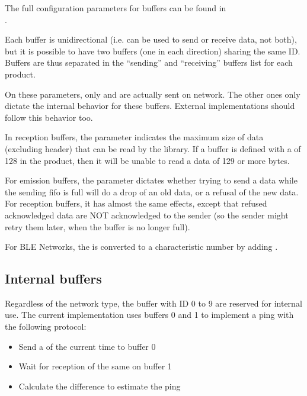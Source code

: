 The full configuration parameters for  buffers can be found in\\
.

Each buffer is unidirectional (i.e. can be used to send or receive data, not both), but it is possible to have two buffers (one in each direction) sharing the same ID. Buffers are thus separated in the ``sending'' and ``receiving'' buffers list for each product.

On these parameters, only  and  are actually sent on network. The other ones only dictate the  internal behavior for these buffers. External implementations should follow this behavior too.

In reception buffers, the  parameter indicates the maximum size of data (excluding  header) that can be read by the library. If a buffer is defined with a  of 128 in the product, then it will be unable to read a data of 129 or more bytes.

For emission buffers, the  parameter dictates whether trying to send a data while the sending fifo is full will do a drop of an old data, or a refusal of the new data. For reception buffers, it has almost the same effects, except that refused acknowledged data are NOT acknowledged to the sender (so the sender might retry them later, when the buffer is no longer full).

For BLE Networks, the  is converted to a characteristic number by adding .


\subsection{Internal buffers}


Regardless of the network type, the buffer with ID 0 to 9 are reserved for  internal use. The current implementation uses buffers 0 and 1 to implement a ping with the following protocol:
\begin{itemize}
\item{Send a  of the current time to buffer 0}
\item{Wait for reception of the same  on buffer 1}
\item{Calculate the difference to estimate the ping}
\end{itemize}

